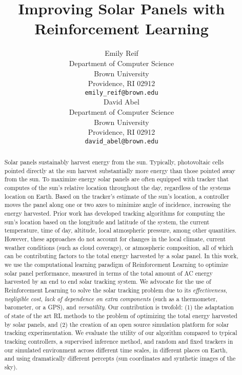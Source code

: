 \documentclass[11pt]{article}
\title{Improving Solar Panels with Reinforcement Learning}
\author{
Emily Reif \\
Department of Computer Science\\
Brown University\\
Providence, RI 02912 \\
\texttt{emily\_reif@brown.edu} \\
\And
David Abel \\
Department of Computer Science\\
Brown University \\
Providence, RI 02912 \\
\texttt{david\_abel@brown.edu} \\
}
\date{}
\begin{document}
\maketitle

\begin{abstract}
Solar panels sustainably harvest energy from the sun. Typically, photovoltaic cells pointed directly at the sun harvest substantially more energy than those pointed away from the sun. To maximize energy solar panels are often equipped with tracker that computes of the sun's relative location throughout the day, regardless of the systems location on Earth. Based on the tracker's estimate of the sun's location, a controller moves the panel along one or two axes to minimize angle of incidence, increasing the energy harvested. Prior work has developed tracking algorithms for computing the sun's location based on the longitude and latitude of the system, the current temperature, time of day, altitude, local atmospheric pressure, among other quantities.
%
However, these approaches do not account for changes in the local climate, current weather conditions (such as cloud coverage), or atmospheric composition, all of which can be contributing factors to the total energy harvested by a solar panel.
%
In this work, we use the computational learning paradigm of Reinforcement Learning to optimize solar panel performance, measured in terms of the total amount of AC energy harvested by an end to end solar tracking system. We advocate for the use of Reinforcement Learning to solve the solar tracking problem due to its {\it effectiveness}, {\it negligible cost}, {\it lack of dependence on extra components} (such as a thermometer, barometer, or a GPS), and {\it versatility}. Our contribution is twofold: (1) the adaptation of state of the art RL methods to the problem of optimizing the total energy harvested by solar panels, and (2) the creation of an open source simulation platform for solar tracking experimentation. We evaluate the utility of our algorithm compared to typical tracking controllers, a supervised inference method, and random and fixed trackers in our simulated environment across different time scales, in different places on Earth, and using dramatically different percepts (sun coordinates and synthetic images of the sky).
\end{abstract}

\end{document}
